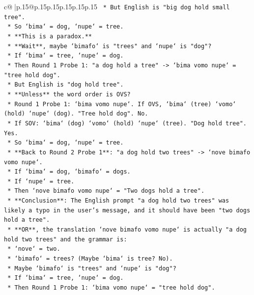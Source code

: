 \documentclass{article}
\begin{document}
{\begin{supertabular}{c@{$\;$}|p{.15\linewidth}@{}p{.15\linewidth}p{.15\linewidth}p{.15\linewidth}p{.15\linewidth}p{.15\linewidth}}
{{{\texttt{            *   But English is "big dog hold small tree".} \\
\texttt{            *   So `bima` = dog, `nupe` = tree.} \\
\texttt{            *   **This is a paradox.**} \\
\texttt{            *   **Wait**, maybe `bimafo` is "trees" and `nupe` is "dog"?} \\
\texttt{            *   If `bima` = tree, `nupe` = dog.} \\
\texttt{            *   Then Round 1 Probe 1: "a dog hold a tree" {-}> `bima vomo nupe` = "tree hold dog".} \\
\texttt{            *   But English is "dog hold tree".} \\
\texttt{            *   **Unless** the word order is OVS?} \\
\texttt{            *   Round 1 Probe 1: `bima vomo nupe`. If OVS, `bima` (tree) `vomo` (hold) `nupe` (dog). "Tree hold dog". No.} \\
\texttt{            *   If SOV: `bima` (dog) `vomo` (hold) `nupe` (tree). "Dog hold tree". Yes.} \\
\texttt{            *   So `bima` = dog, `nupe` = tree.} \\
\texttt{            *   **Back to Round 2 Probe 1**: "a dog hold two trees" {-}> `nove bimafo vomo nupe`.} \\
\texttt{            *   If `bima` = dog, `bimafo` = dogs.} \\
\texttt{            *   If `nupe` = tree.} \\
\texttt{            *   Then `nove bimafo vomo nupe` = "Two dogs hold a tree".} \\
\texttt{            *   **Conclusion**: The English prompt "a dog hold two trees" was likely a typo in the user's message, and it should have been "two dogs hold a tree".} \\
\texttt{            *   **OR**, the translation `nove bimafo vomo nupe` is actually "a dog hold two trees" and the grammar is:} \\
\texttt{                *   `nove` = two.} \\
\texttt{                *   `bimafo` = trees? (Maybe `bima` is tree? No).} \\
\texttt{                *   Maybe `bimafo` is "trees" and `nupe` is "dog"?} \\
\texttt{                *   If `bima` = tree, `nupe` = dog.} \\
\texttt{                *   Then Round 1 Probe 1: `bima vomo nupe` = "tree hold dog".} \\
}}}
\end{supertabular}}
\end{document}
